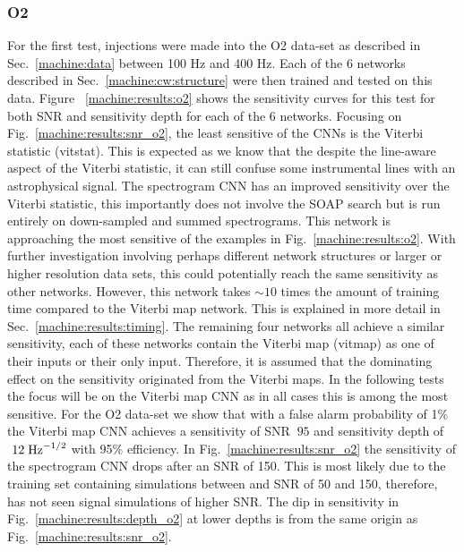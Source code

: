 \subsubsection{O2}

%
For the first test, injections were made into the O2 data-set as described in
Sec.~\ref{machine:data} between 100 Hz and 400 Hz. Each of the 6 networks described in
Sec.~\ref{machine:cw:structure} were then trained and tested on this data.
Figure ~\ref{machine:results:o2} shows the sensitivity curves for
this test for both \gls{SNR} and sensitivity depth for each of the 6 networks.
Focusing on Fig.~\ref{machine:results:snr_o2}, the least sensitive of the \glspl{CNN} is the
Viterbi statistic (vitstat). This is
expected as we know that the despite the line-aware aspect of the Viterbi statistic, it can still confuse some instrumental lines with an astrophysical signal. 
The spectrogram \gls{CNN} has an improved sensitivity over the Viterbi statistic,
this importantly does not involve the SOAP search but is run entirely on
down-sampled and summed spectrograms. This network is approaching the
most sensitive of the examples in Fig.~\ref{machine:results:o2}.
With further investigation involving perhaps different network structures or larger or higher resolution data sets, this could potentially reach the same sensitivity as other networks. However, this network
takes $\sim10$ times the amount of training time compared to the Viterbi map network. This
is explained in more detail in Sec.~\ref{machine:results:timing}. The
remaining four networks all achieve a similar sensitivity, each of these
networks contain the Viterbi map (vitmap) as one of their inputs or their only
input. Therefore, it is assumed that the dominating effect on the sensitivity
originated from the Viterbi maps.  In the following tests the focus
will be on the Viterbi map \gls{CNN} as in all cases this is among the most
sensitive. For the O2 data-set we show that with a false
alarm probability of 1\% the Viterbi map \gls{CNN} achieves a
sensitivity of \gls{SNR} $~95$ and sensitivity depth of $~12\; {\rm Hz}^{-1/2}$
with 95\% efficiency.
In Fig.~\ref{machine:results:snr_o2} the sensitivity of the spectrogram \gls{CNN} drops after an \gls{SNR} of 150. 
This is most likely due to the training set containing simulations between and \gls{SNR} of 50 and 150, therefore, has not seen signal simulations of higher \gls{SNR}.
The dip in sensitivity in Fig.~\ref{machine:results:depth_o2} at lower depths is from the same origin as Fig.~\ref{machine:results:snr_o2}. 



